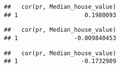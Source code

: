 \documentclass[
]{article}
\newenvironment{Shaded}{\begin{snugshade}}{\end{snugshade}}
\newcommand{\DataTypeTok}[1]{\textcolor[rgb]{0.13,0.29,0.53}{#1}}
\newcommand{\DecValTok}[1]{\textcolor[rgb]{0.00,0.00,0.81}{#1}}
\newcommand{\KeywordTok}[1]{\textcolor[rgb]{0.13,0.29,0.53}{\textbf{#1}}}
\newcommand{\NormalTok}[1]{#1}
\newcommand{\OperatorTok}[1]{\textcolor[rgb]{0.81,0.36,0.00}{\textbf{#1}}}
\newcommand{\StringTok}[1]{\textcolor[rgb]{0.31,0.60,0.02}{#1}}
\begin{document}
\begin{verbatim}
##   cor(pr, Median_house_value)
## 1                   0.1980093
\end{verbatim}

\begin{Shaded}
\end{Shaded}

\begin{verbatim}
##   cor(pr, Median_house_value)
## 1                -0.009840453
\end{verbatim}

\begin{Shaded}
\end{Shaded}

\begin{verbatim}
##   cor(pr, Median_house_value)
## 1                  -0.1732909
\end{verbatim}

\begin{Shaded}
\end{Shaded}
\end{document}
